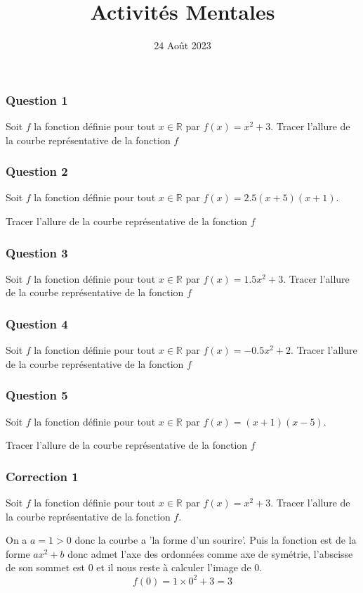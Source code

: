 \documentclass[15pt, mathserif]{beamer}
\title{Activités Mentales}
\date{24 Août 2023}
\newcommand{\R}{\mathbb{R}}			%
\begin{document}
\begin{frame}
    \titlepage
\end{frame}

\begin{frame} 
	\frametitle{Question 1}
 Soit $f$ la fonction définie pour tout $x \in \R$ par $f(x)=x^2+3$. Tracer l'allure de la courbe représentative de la fonction $f$\end{frame}


\begin{frame} 
	\frametitle{Question 2}
 Soit $f$ la fonction définie pour tout $x \in \R$ par $f(x)=2.5(x+5)(x+1)$. 
 
  Tracer l'allure de la courbe représentative de la fonction $f$\end{frame}


\begin{frame} 
	\frametitle{Question 3}
 Soit $f$ la fonction définie pour tout $x \in \R$ par $f(x)=1.5x^2+3$. Tracer l'allure de la courbe représentative de la fonction $f$\end{frame}


\begin{frame} 
	\frametitle{Question 4}
 Soit $f$ la fonction définie pour tout $x \in \R$ par $f(x)=-0.5x^2+2$. Tracer l'allure de la courbe représentative de la fonction $f$\end{frame}


\begin{frame} 
	\frametitle{Question 5}
 Soit $f$ la fonction définie pour tout $x \in \R$ par $f(x)=(x+1)(x-5)$. 
 
  Tracer l'allure de la courbe représentative de la fonction $f$\end{frame}


\begin{frame}
\vspace{-10mm}
	\frametitle{Correction 1}
\vspace*{1cm} 
 Soit $f$ la fonction définie pour tout $x \in \R$ par $f(x)=x^2 +3$. Tracer l'allure de la courbe représentative de la fonction $f$. 
 
 \begin{multicols}{2} 
 On a $a=1>0$ donc la courbe a 'la forme d'un sourire'. Puis la fonction est de la forme $ax^2+b$ donc admet l'axe des ordonnées comme axe de symétrie, l'abscisse de son sommet est 0 et il nous reste à calculer l'image de 0. $$f(0)= 1\times 0^2+3=3$$ 
 
  \columnbreak  
 
 \end{multicols} 
 \end{frame}
\end{document}
